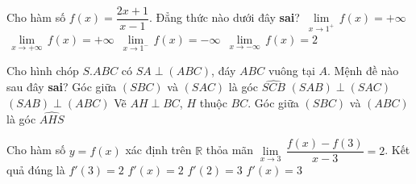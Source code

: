\begin{ex}%
 Cho hàm số $f(x)=\dfrac{2x+1}{x-1}$. Đẳng thức nào dưới đây \textbf{sai}? 
\choice
{$\,\underset{x\to {{1}^{+}}}{\mathop{\lim }}\,f(x)=+\infty $}
{\True $\,\underset{x\to +\infty }{\mathop{\lim }}\,f(x)=+\infty $}
{$\,\underset{x\to {{1}^{-}}}{\mathop{\lim }}\,f(x)=-\infty $}
{$\,\underset{x\to -\infty }{\mathop{\lim }}\,f(x)=2$}
\end{ex}
\begin{ex}%
 Cho hình chóp $S.ABC$ có $SA \perp (ABC)$, đáy $ABC$ vuông tại $A$. Mệnh đề nào sau đây \textbf{sai}?
\choice
{\True Góc giữa $(SBC)$ và $(SAC)$ là góc $\widehat{SCB}$}
{$(SAB)\perp (SAC)$}
{$(SAB)\perp (ABC)$}
{Vẽ $AH\perp BC$, $H$ thuộc $BC$. Góc giữa $(SBC)$ và $(ABC)$ là góc $\widehat{AHS}$}
\end{ex}
\begin{ex}%
 Cho hàm số $y=f\left( x \right)$ xác định trên $\mathbb{R}$ thỏa mãn $\underset{x\to 3}{\mathop{\lim }}\,\dfrac{f\left( x \right)-f\left( 3 \right)}{x-3}=2$. Kết quả đúng là
\choice
{\True $f'\left( 3 \right)=2$}
{$f'\left( x \right)=2$}
{$f'\left( 2 \right)=3$}
{$f'\left( x \right)=3$}
\end{ex}
